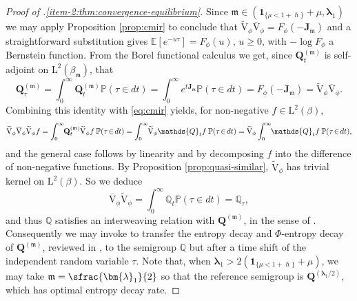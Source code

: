 \documentclass[JEP,XML,SOM,Unicode]{cedram}
\theoremstyle{plain}
\theoremstyle{definition}
\newcommand{\E}{\mathbb{E}}
\newcommand{\Prob}{\mathbb{P}}
\newcommand{\J}{\mathds{Q}}
\newcommand{\Leb}{\mathrm{L}}
\newcommand{\calJd}{\mathbf{J}}
\newcommand{\m}{\mathfrak{m}}
\newcommand{\lam}{{\bm{\lambda}_1}}
\newcommand{\Q}[1][\mo]{\mathbf{Q}^{({#1})}}
\newcommand{\gab}[1][\lam,\mo]{{\beta_{#1}}}
\let\h\hslash
\let\mo\mu
\let\bpsi\beta
\begin{document}
\begin{proof}[Proof of .\eqref{item-2:thm:convergence-equilibrium}]
Since $\m \in (\bm{1}_{\{\mo < 1+\h\}} + \mo, \lam)$ we may apply Proposition \ref{prop:cmir} to conclude that $\widetilde{\mathrm{V}}_\phi \overline{\mathrm{V}}_\phi = F_\phi(-\calJd_{\m})$ and a straightforward substitution gives $\E\left[e^{-u\tau}\right] = F_\phi(u)$, $u \geq 0$, with $-\log F_\phi$ a Bernstein function. From the Borel functional calculus we get, since $\Q[\m]_t$ is self-adjoint on $\Leb^2(\gab[\m])$, that
\begin{equation*}
\Q[\m]_\tau = \int_0^\infty \Q[\m]_t \Prob(\tau \in dt) = \int_0^\infty e^{t\calJd_{\m}} \Prob(\tau \in dt) = F_\phi(-\calJd_{\m}) = \widetilde{\mathrm{V}}_\phi \overline{\mathrm{V}}_\phi.
\end{equation*}
Combining this identity with \eqref{eq:cmir} yields, for non-negative $f \in \Leb^2(\bpsi)$,
\begin{equation*}
\widetilde{\mathrm{V}}_\phi \overline{\mathrm{V}}_\phi \widetilde{\mathrm{V}}_\phi f = \int_0^\infty\hspace*{-1mm} \Q[\m]_t \widetilde{\mathrm{V}}_\phi f \: \Prob(\tau\!\in\!dt) = \int_0^\infty\hspace*{-1mm} \widetilde{\mathrm{V}}_\phi \J_t f \: \Prob(\tau\!\in\!dt) = \widetilde{\mathrm{V}}_\phi \int_0^\infty\hspace*{-1mm} \J_t f \: \Prob(\tau\!\in\!dt),
\end{equation*}
and the general case follows by linearity and by decomposing $f$ into the difference of non-negative functions. By Proposition \ref{prop:quasi-similar}, $\widetilde{\mathrm{V}}_\phi$ has trivial kernel on $\Leb^2(\bpsi)$. So we deduce
\begin{equation}
\label{eq:J-tau}
\overline{\mathrm{V}}_\phi \widetilde{\mathrm{V}}_\phi = \int_0^\infty \J_t \Prob(\tau\!\in\!dt) = \J_\tau,
\end{equation}
and thus $\J$ satisfies an interweaving relation with $\Q[\m]$, in the sense of \cite{Patie-Miclo}. Consequently we may invoke \cite[Ths.\,7, 24]{Patie-Miclo} to transfer the entropy decay and $\Phi$-entropy decay of $\Q[\m]$, reviewed in , to the semigroup $\J$ but after a time shift of the independent random variable $\tau$. Note that, when $\lam > 2(\bm{1}_{\{\mo < 1+\h\}} + \mo)$, we may take $\m = \sfrac{\lam}{2}$ so that the reference semigroup is $\Q[\lam/2]$, which has optimal entropy decay rate.
\end{proof}
\end{document}
